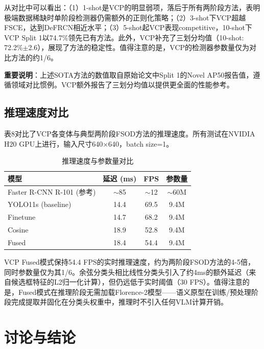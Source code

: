 \documentclass[zihao=5,a4paper,twocolumn]{ctexart}
\begin{document}
从对比中可以看出：（1）1-shot是VCP的明显弱项，落后于所有两阶段方法，表明极端数据稀缺时单阶段检测器仍需额外的正则化策略；（2）3-shot下VCP超越FSCE，达到DeFRCN相近水平；（3）5-shot起VCP表现competitive，10-shot下VCP Split 1以74.7\%领先已有方法。此外，VCP补充了三划分均值（10-shot: 72.2\%$\pm$2.6），展现了方法的稳定性。值得注意的是，VCP的检测器参数量仅为对比方法的约1/6。

\textbf{重要说明}：上述SOTA方法的数值取自原始论文中Split 1的Novel AP50报告值，遵循领域对比惯例。VCP额外报告了三划分均值以提供更全面的性能参考。

\subsection{推理速度对比}

表8对比了VCP各变体与典型两阶段FSOD方法的推理速度。所有测试在NVIDIA H20 GPU上进行，输入尺寸640$\times$640，batch size=1。

\begin{table}[ht]
\centering
\caption{推理速度与参数量对比}
\label{tab:fps}
\begin{tabular}{lccc}
\toprule
模型 & 延迟 (ms) & FPS & 参数量 \\
\midrule
Faster R-CNN R-101 (参考) & $\sim$85 & $\sim$12 & $\sim$60M \\
\midrule
YOLO11s (baseline) & 14.4 & 69.5 & 9.4M \\
Finetune            & 14.7 & 68.2 & 9.4M \\
Cosine              & 18.9 & 52.8 & 9.4M \\
Fused               & 18.4 & 54.4 & 9.4M \\
\bottomrule
\end{tabular}
\end{table}

VCP Fused模式保持54.4 FPS的实时推理速度，约为两阶段FSOD方法的4-5倍，同时参数量仅为其1/6。余弦分类头相比线性分类头引入了约4ms的额外延迟（来自候选框特征的L2归一化计算），但仍远低于实时阈值（30 FPS）。值得注意的是，Fused模式在推理阶段无需加载Florence-2模型——语义原型在训练/预处理阶段完成提取并固化在分类头权重中，推理时不引入任何VLM计算开销。


\section{讨论与结论}
\end{document}
